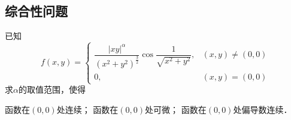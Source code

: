 \documentclass[12pt, a4paper, oneside, UTF8]{ctexbook}
\begin{document}
\subsection{综合性问题}
\begin{exercise}
    已知
    \[f(x,y)=\begin{cases}
    \dfrac{|xy|^\alpha}{(x^2+y^2)^\frac{3}{2}}\cos\dfrac{1}{\sqrt{x^2+y^2}},&(x,y)\ne (0,0)\\
    0, & (x,y) = (0,0)
    \end{cases}\]
    求$\alpha$的取值范围，使得\begin{tasks}[label = (\arabic*), label-width = 1.5em, label-align = right, column-sep = 1em]
    \task 函数在$(0,0)$处连续；
    \task 函数在$(0,0)$处可微；
    \task 函数在$(0,0)$处偏导数连续．
    \end{tasks}
\end{exercise}
\end{document}
